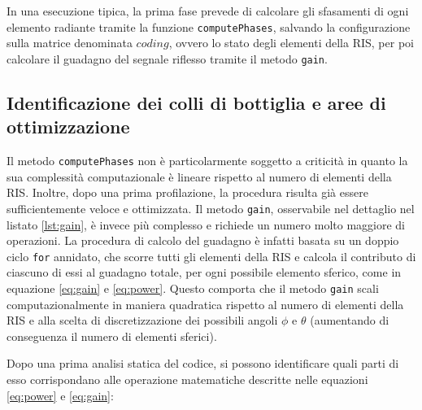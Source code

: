 In una esecuzione tipica, la prima fase prevede di calcolare gli sfasamenti di ogni
elemento radiante tramite la funzione \texttt{computePhases}, salvando la configurazione
sulla matrice denominata $coding$, ovvero lo stato degli elementi della RIS, per
poi calcolare il guadagno del segnale riflesso tramite il metodo \texttt{gain}.

\subsection{Identificazione dei colli di bottiglia e aree di ottimizzazione}
\label{sec:ottimizzazione}

Il metodo \texttt{computePhases} non è particolarmente soggetto a criticità in
quanto la sua complessità computazionale è lineare rispetto al numero di
elementi della RIS. Inoltre, dopo una prima profilazione, la procedura risulta già
essere sufficientemente veloce e ottimizzata. Il metodo \texttt{gain},
osservabile nel dettaglio nel listato \ref{lst:gain}, è invece più complesso e richiede
un numero molto maggiore di operazioni. La procedura di calcolo del guadagno è
infatti basata su un doppio ciclo \texttt{for} annidato, che scorre tutti gli
elementi della RIS e calcola il contributo di ciascuno di essi al guadagno
totale, per ogni possibile elemento sferico, come in equazione \ref{eq:gain} e
\ref{eq:power}. Questo comporta che il metodo \texttt{gain} scali
computazionalmente in maniera quadratica rispetto al numero di elementi della
RIS e alla scelta di discretizzazione dei possibili angoli $\phi$ e $\theta$ (aumentando
di conseguenza il numero di elementi sferici).

\vspace{1em}

\vspace{1em}

Dopo una prima analisi statica del codice, si possono identificare quali parti
di esso corrispondano alle operazione matematiche descritte nelle equazioni
\ref{eq:power} e \ref{eq:gain}:

